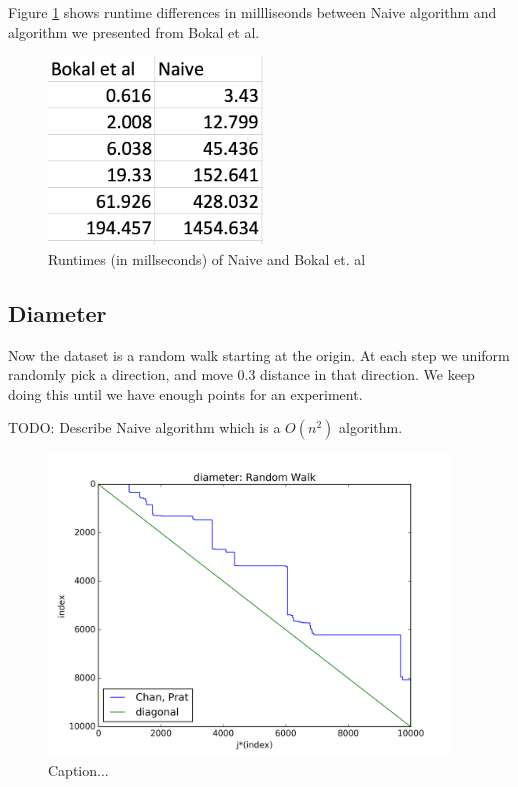 \documentclass{article}
\begin{document}
Figure \ref{fig:monotonicity_comparison} shows runtime differences in millliseonds between Naive algorithm and algorithm we presented from Bokal et al.
\begin{figure}[!ht]
  \centering
  \includegraphics[height=5cm]{plots/monotonicity_comparison}
  \caption{Runtimes (in millseconds) of Naive and Bokal et. al}
  \label{fig:monotonicity_comparison}
\end{figure}

\subsection{Diameter}

Now the dataset is a random walk starting at the origin. At each step we uniform randomly pick a direction, and move 0.3 distance in that direction. We keep doing this until we have enough points for an experiment.

TODO: Describe Naive algorithm which is a $O(n^2)$ algorithm.

\begin{figure}[!h]
  \centering
  \includegraphics[height=8cm]{plots/diameter_random_walk}
  \caption{Caption...}
  \label{fig:diameter_demo}
\end{figure}
\end{document}
